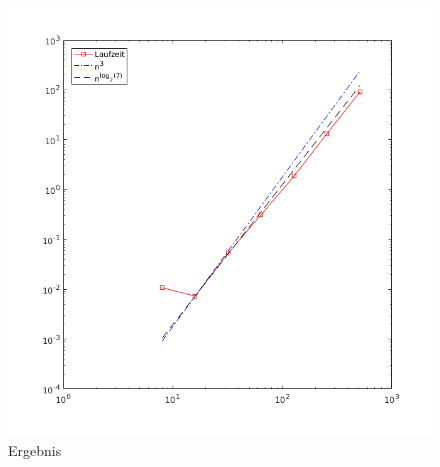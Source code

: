 \documentclass[ngerman,12pt]{article}
\begin{document}
\begin{figure}[h]
    \centering
    
    \includegraphics[width=\columnwidth]{A5v.png}
    \caption{Ergebnis}
    \label{fig:ergebnis}
\end{figure}
\end{document}
